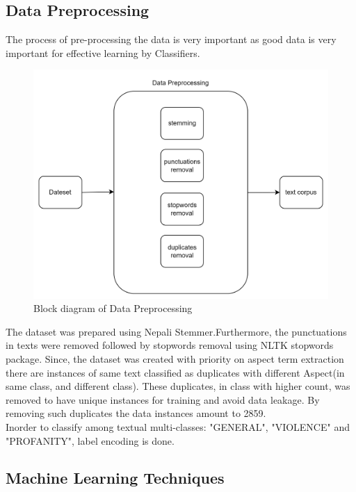 \newpage


\subsection{Data Preprocessing}
The process of pre-processing the data is very important as good data is very important for effective learning by Classifiers.

\begin{figure}[h]
\centering
\includegraphics[scale=0.2]{images/meth.png}
\caption{Block diagram of Data Preprocessing}
\end{figure}

The dataset was prepared using Nepali Stemmer.Furthermore, the punctuations in texts were removed followed by stopwords removal using NLTK stopwords package. Since, the dataset was created with priority on aspect term extraction there are instances of same text classified as duplicates with different Aspect(in same class, and different class). These duplicates, in class with higher count, was removed to have unique instances for training and avoid data leakage. By removing such duplicates the data instances amount to 2859.\\
Inorder to classify among textual multi-classes: "GENERAL", "VIOLENCE" and "PROFANITY", label encoding is done.
\subsection{Machine Learning Techniques}
